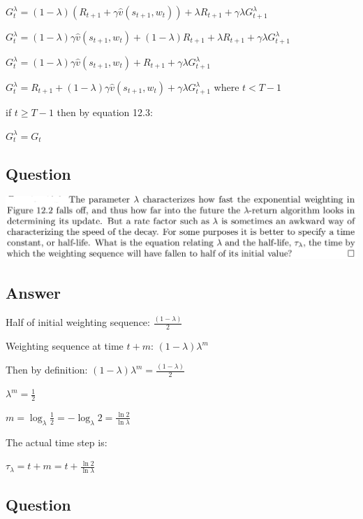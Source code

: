 \documentclass[11pt]{article}
\begin{document}
    \noindent $ G_{t}^\lambda = (1-\lambda) (R_{t+1} + \gamma \hat{v}(s_{t+1},w_{t}) ) +  \lambda R_{t+1} +  \gamma \lambda G_{t+1}^\lambda $

    \noindent $ G_{t}^\lambda = (1-\lambda) \gamma \hat{v}(s_{t+1},w_{t})  + (1-\lambda) R_{t+1} +  \lambda R_{t+1} +  \gamma \lambda G_{t+1}^\lambda $

    \noindent $ G_{t}^\lambda = (1-\lambda) \gamma \hat{v}(s_{t+1},w_{t})  + R_{t+1} +  \gamma \lambda G_{t+1}^\lambda $

    \noindent $ G_{t}^\lambda =  R_{t+1} + (1-\lambda) \gamma \hat{v}(s_{t+1},w_{t}) +  \gamma \lambda G_{t+1}^\lambda $ where $t < T-1$

    \hfill \break
    \noindent if $t \ge T-1$ then by equation 12.3:

    \noindent $ G_{t}^\lambda = G_t $



    \subsection{Question}

    \includegraphics[scale=0.9]{exercise_12_2q}

    \subsection*{Answer}

    \noindent Half of initial weighting sequence:
    \noindent $ \frac{(1-\lambda)}{2} $

    \noindent Weighting sequence at time $t+m$:
    \noindent $ (1-\lambda) \lambda^m $

    \noindent Then by definition:
    \noindent $ (1-\lambda) \lambda^m = \frac{(1-\lambda)}{2} $

    \noindent $ \lambda^m = \frac{1}{2} $

    \noindent $ m = \log_{\lambda} \frac{1}{2} = - \log_{\lambda} 2 = \frac{\ln 2}{\ln \lambda}$

    \noindent The actual time step is:

    \noindent $ \tau_{\lambda} = t + m = t + \frac{\ln 2}{\ln \lambda} $


    \subsection{Question}
\end{document}

